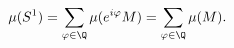 \documentclass[preview]{standalone}
\begin{document}
\begin{align*}
\mu(S^1) = \sum_{\varphi \in \Q} \mu(e^{i\varphi} M) = \sum_{\varphi \in \Q} \mu(M).
\end{align*}
\end{document}
